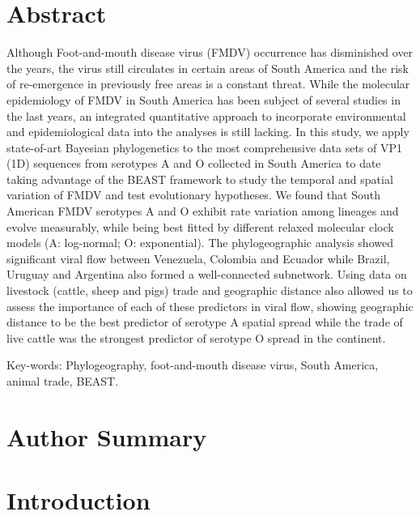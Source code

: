 \documentclass[10pt]{article}
\begin{document}
\section*{Abstract}
Although Foot-and-mouth disease virus (FMDV) occurrence has disminished over the years, the virus still circulates in certain areas of South America and the risk of re-emergence in previously free areas is a constant threat.
While the molecular epidemiology of FMDV in South America has been subject of several studies in the last years, an integrated quantitative approach to incorporate environmental and epidemiological data into the analyses is still lacking.
In this study, we apply state-of-art Bayesian phylogenetics to the most comprehensive data sets of VP1 (1D) sequences from serotypes A and O collected in South America to date taking advantage of the BEAST framework to study the temporal and spatial variation of FMDV and test evolutionary hypotheses.
We found that South American FMDV serotypes A and O exhibit rate variation among lineages and evolve measurably, while being best fitted by different relaxed molecular clock models (A: log-normal; O: exponential).
The phylogeographic analysis showed significant viral flow between Venezuela, Colombia and Ecuador while Brazil, Uruguay and Argentina also formed a well-connected subnetwork.
Using data on livestock (cattle, sheep and pigs) trade and geographic distance also allowed us to assess the importance of each of these predictors in viral flow, showing geographic distance to be the best predictor of serotype A spatial spread while the trade of live cattle was the strongest predictor of serotype O spread in the continent.

Key-words: Phylogeography, foot-and-mouth disease virus, South America, animal trade, BEAST.
\section*{Author Summary} %

\section*{Introduction}
\end{document}
